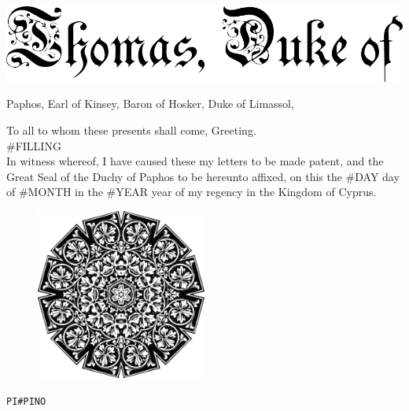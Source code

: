 \documentclass[varwidth=true,border=50pt]{standalone}
\begin{document}
    \thispagestyle{fancy}

    \noindent \includegraphics[width=\textwidth]{images/thomas_duke_of}

    {\LARGE
        Paphos, Earl of Kinsey, Baron of Hosker, Duke of Limassol,

        \setlength{\parindent}{20pt}

        To all to whom these presents shall come, Greeting.\\

        #FILLING\\

        In witness whereof, I have caused these my letters to be made patent,
        and the Great Seal of the Duchy of Paphos to be hereunto affixed, on
        this the #DAY day of #MONTH in the #YEAR year of my regency in the
        Kingdom of Cyprus.
    }

    \vspace{20pt}

    \begin{figure}[h]
        \centering
        \includegraphics[width=0.5\textwidth]{images/seal}
    \end{figure}

    \hfill {\footnotesize \texttt{PI{#PINO}}}
\end{document}
